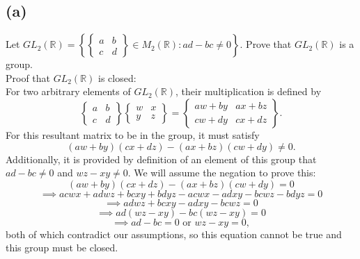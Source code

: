 \documentclass[12pt,letterpaper]{article}
\begin{document}
\subsection*{(a)}
Let \(GL_{2}(\mathbb{R}) = \left\{ \begin{Bmatrix} a & b \\ c & d \end{Bmatrix} \in M_{2}(\mathbb{R}) : ad - bc \neq 0 \right\}\). Prove that \(GL_{2}(\mathbb{R})\) is a group. \\

Proof that \(GL_{2}(\mathbb{R})\) is closed: \\

For two arbitrary elements of \(GL_{2}(\mathbb{R})\), their multiplication is defined by \[\begin{Bmatrix} a & b \\ c & d \end{Bmatrix} \begin{Bmatrix} w & x \\ y & z \end{Bmatrix} = \begin{Bmatrix} aw + by & ax + bz \\ cw + dy & cx + dz \end{Bmatrix}.\] For this resultant matrix to be in the group, it must satisfy \[(aw+by)(cx+dz) - (ax + bz )(cw + dy) \neq 0.\] Additionally, it is provided by definition of an element of this group that \(ad - bc \neq 0\) and \(wz - xy \neq 0 \). We will assume the negation to prove this:  \[(aw+by)(cx+dz) - (ax + bz)(cw+dy) = 0\] \[\implies acwx + adwz + bcxy + bdyz -  acwx - adxy - bcwz - bdyz = 0\] \[\implies adwz + bcxy - adxy - bcwz = 0\] \[\implies ad(wz - xy) - bc(wz - xy) = 0\] \[\implies ad - bc = 0 \text{ or } wz - xy = 0,\] both of which contradict our assumptions, so this equation cannot be true and this group must be closed. 
\end{document}
